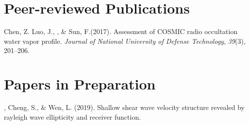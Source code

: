 \newcommand{\Revision}{\textit{under revision}}
\newcommand{\CS}{*} %
\newcommand{\CF}{\textsuperscript{\#}} %


\section*{Peer-reviewed Publications}

\begin{etaremune}
\item
    Chen, Z. Luo, J.,  \Xiao, \& Sun, F.(2017).
    Assessment of COSMIC radio occultation water vapor profile.
    \textit{Journal of National University of Defense Technology}, \textit{39}(3), 201--206.
\end{etaremune}

\section*{Papers in Preparation}
\begin{etaremune}
\item
    \Xiao, Cheng, S.,  \& Wen, L. (2019).
    Shallow shear wave velocity structure revealed by rayleigh wave ellipticity and receiver function.
\end{etaremune}

